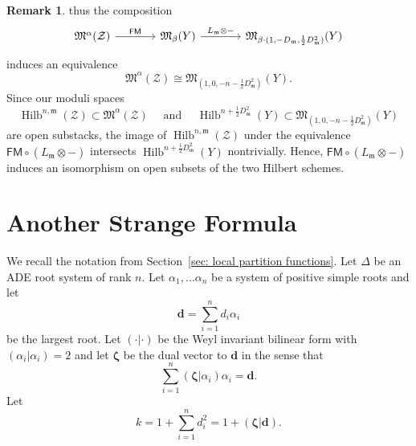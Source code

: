 \documentclass{amsart}
\theoremstyle{definition}
\newtheorem{remark}[theorem]{Remark}
\newcommand{\half}{\frac{1}{2}}
\newcommand{\M}{\mathfrak{M}}
\newcommand{\mdata}{\mathfrak{m}}
\newcommand{\FM}{\mathsf{FM}}
\newcommand{\Zcal}{\mathcal{Z}}
\newcommand{\zetavec}{\bm{\zeta }}
\newcommand{\dvec}{\bm{d }}
\newcommand{\Hilb}{\operatorname{Hilb}}
\begin{document}
\begin{remark}
	thus the composition
	\[
	\begin{tikzcd}[column sep = large]
	\M^{\alpha}(\Zcal ) \arrow[r,"{\FM }"]&
	\M_{\beta}(Y) \arrow[r,"{L_{\mdata}\otimes -}"] &
	\M_{\beta \cdot (1,-D_{\mdata},\half D_{\mdata}^{2})}(Y)
	\end{tikzcd}
	\] 
	induces an equivalence
	\[
	\M^{\alpha}(\Zcal )\cong \M_{(1,0,-n-\half D_{\mdata}^{2})}(Y).
	\]
	Since our moduli spaces
	\[
	\Hilb^{n,\mdata}(\Zcal )\subset \M^{\alpha}(\Zcal)\quad \text{ and } \quad \Hilb^{n+\half D_{\mdata}^{2}}(Y)\subset \M_{(1,0,-n-\half D_{\mdata}^{2})}(Y)
	\]
	are open substacks, the image of
	$\Hilb^{n,\mdata}(\Zcal )$ under the equivalence $\FM \circ
	(L_{\mdata}\otimes -)$ intersects $\Hilb^{n+\half D_{\mdata}^{2}}(Y)$ nontrivially. Hence, $\FM \circ
	(L_{\mdata}\otimes -)$ induces an isomorphism on open subsets of the two Hilbert schemes. 
\end{remark}



\appendix
\section{Another Strange Formula}\label{sec: another strange
formula}

We recall the notation from Section~\ref{sec: local partition
functions}. Let $\Delta$ be an ADE root system of rank $n$. Let
$\alpha_{1},\dotsc \alpha_{n}$ be a system of positive simple roots
and let
\[
\dvec  = \sum_{i=1}^{n} d_{i} \alpha_{i}
\]
be the largest root. Let $(\cdot |\cdot )$ be the Weyl invariant
bilinear form with $(\alpha_{i}|\alpha_{i})=2$ and let $\zetavec$ be
the dual vector to $\dvec$ in the sense that
\begin{equation}\label{eqn: d = sum (zeta|ai)ai}
\sum_{i=1}^{n} (\zetavec |\alpha_{i}) \alpha_{i} = \dvec .
\end{equation}
Let 
\begin{equation}\label{eqn: k=1+(zeta|d)}
k=1+\sum_{i=1}^{n}d_{i}^{2} =  1+(\zetavec |\dvec ). 
\end{equation}
\end{document}
